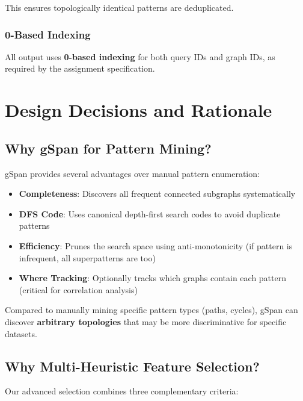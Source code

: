 \documentclass[12pt,a4paper]{article}
\begin{document}
This ensures topologically identical patterns are deduplicated.

\subsubsection{0-Based Indexing}

All output uses \textbf{0-based indexing} for both query IDs and graph IDs, as required by the assignment specification.

\section{Design Decisions and Rationale}

\subsection{Why gSpan for Pattern Mining?}

gSpan provides several advantages over manual pattern enumeration:

\begin{itemize}
    \item \textbf{Completeness}: Discovers all frequent connected subgraphs systematically
    \item \textbf{DFS Code}: Uses canonical depth-first search codes to avoid duplicate patterns
    \item \textbf{Efficiency}: Prunes the search space using anti-monotonicity (if pattern is infrequent, all superpatterns are too)
    \item \textbf{Where Tracking}: Optionally tracks which graphs contain each pattern (critical for correlation analysis)
\end{itemize}

Compared to manually mining specific pattern types (paths, cycles), gSpan can discover \textbf{arbitrary topologies} that may be more discriminative for specific datasets.

\subsection{Why Multi-Heuristic Feature Selection?}

Our advanced selection combines three complementary criteria:
\end{document}
